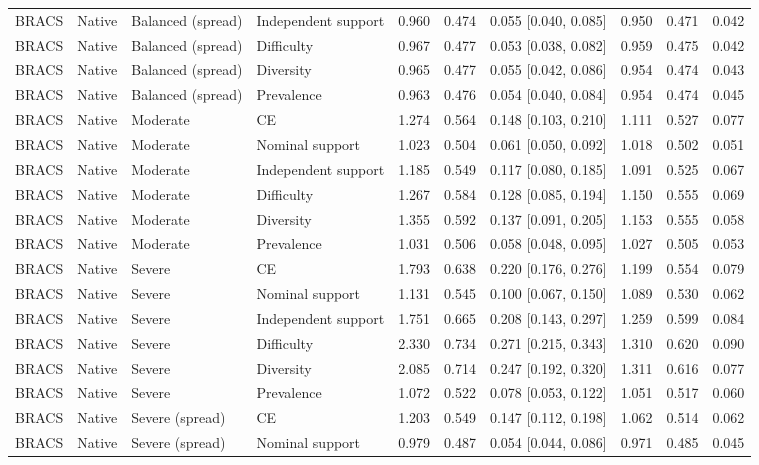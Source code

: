 \begin{longtable}{llllllllll}
BRACS & Native & Balanced (spread) & Independent support & 0.960 & 0.474 & 0.055 [0.040, 0.085] & 0.950 & 0.471 & 0.042 \\
BRACS & Native & Balanced (spread) & Difficulty & 0.967 & 0.477 & 0.053 [0.038, 0.082] & 0.959 & 0.475 & 0.042 \\
BRACS & Native & Balanced (spread) & Diversity & 0.965 & 0.477 & 0.055 [0.042, 0.086] & 0.954 & 0.474 & 0.043 \\
BRACS & Native & Balanced (spread) & Prevalence & 0.963 & 0.476 & 0.054 [0.040, 0.084] & 0.954 & 0.474 & 0.045 \\
BRACS & Native & Moderate & CE & 1.274 & 0.564 & 0.148 [0.103, 0.210] & 1.111 & 0.527 & 0.077 \\
BRACS & Native & Moderate & Nominal support & 1.023 & 0.504 & 0.061 [0.050, 0.092] & 1.018 & 0.502 & 0.051 \\
BRACS & Native & Moderate & Independent support & 1.185 & 0.549 & 0.117 [0.080, 0.185] & 1.091 & 0.525 & 0.067 \\
BRACS & Native & Moderate & Difficulty & 1.267 & 0.584 & 0.128 [0.085, 0.194] & 1.150 & 0.555 & 0.069 \\
BRACS & Native & Moderate & Diversity & 1.355 & 0.592 & 0.137 [0.091, 0.205] & 1.153 & 0.555 & 0.058 \\
BRACS & Native & Moderate & Prevalence & 1.031 & 0.506 & 0.058 [0.048, 0.095] & 1.027 & 0.505 & 0.053 \\
BRACS & Native & Severe & CE & 1.793 & 0.638 & 0.220 [0.176, 0.276] & 1.199 & 0.554 & 0.079 \\
BRACS & Native & Severe & Nominal support & 1.131 & 0.545 & 0.100 [0.067, 0.150] & 1.089 & 0.530 & 0.062 \\
BRACS & Native & Severe & Independent support & 1.751 & 0.665 & 0.208 [0.143, 0.297] & 1.259 & 0.599 & 0.084 \\
BRACS & Native & Severe & Difficulty & 2.330 & 0.734 & 0.271 [0.215, 0.343] & 1.310 & 0.620 & 0.090 \\
BRACS & Native & Severe & Diversity & 2.085 & 0.714 & 0.247 [0.192, 0.320] & 1.311 & 0.616 & 0.077 \\
BRACS & Native & Severe & Prevalence & 1.072 & 0.522 & 0.078 [0.053, 0.122] & 1.051 & 0.517 & 0.060 \\
BRACS & Native & Severe (spread) & CE & 1.203 & 0.549 & 0.147 [0.112, 0.198] & 1.062 & 0.514 & 0.062 \\
BRACS & Native & Severe (spread) & Nominal support & 0.979 & 0.487 & 0.054 [0.044, 0.086] & 0.971 & 0.485 & 0.045 \\

\end{longtable}
